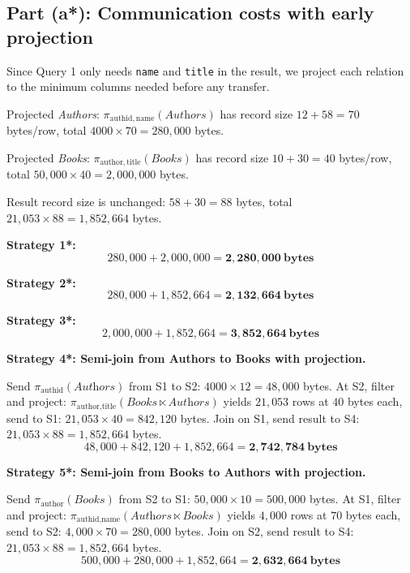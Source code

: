 \documentclass[a4paper,11pt]{article}
\newcommand{\lsj}{\mathbin{\ltimes}}   %
\newcommand{\Authors}{\textit{Authors}}
\newcommand{\Books}{\textit{Books}}
\begin{document}
\subsection*{Part (a*): Communication costs with early projection}

Since Query 1 only needs \texttt{name} and \texttt{title} in the result, we project each relation to the minimum columns needed before any transfer.

Projected \Authors: $\pi_{\text{authid},\,\text{name}}(\Authors)$ has record size $12 + 58 = 70$ bytes/row, total $4000 \times 70 = 280{,}000$ bytes.

Projected \Books: $\pi_{\text{author},\,\text{title}}(\Books)$ has record size $10 + 30 = 40$ bytes/row, total $50{,}000 \times 40 = 2{,}000{,}000$ bytes.

Result record size is unchanged: $58 + 30 = 88$ bytes, total $21{,}053 \times 88 = 1{,}852{,}664$ bytes.

\medskip

\textbf{Strategy 1*:}
\[
  280{,}000 + 2{,}000{,}000 = \mathbf{2{,}280{,}000\ \text{bytes}}
\]

\textbf{Strategy 2*:}
\[
  280{,}000 + 1{,}852{,}664 = \mathbf{2{,}132{,}664\ \text{bytes}}
\]

\textbf{Strategy 3*:}
\[
  2{,}000{,}000 + 1{,}852{,}664 = \mathbf{3{,}852{,}664\ \text{bytes}}
\]

\textbf{Strategy 4*: Semi-join from Authors to Books with projection.}

Send $\pi_{\text{authid}}(\Authors)$ from S1 to S2: $4000 \times 12 = 48{,}000$ bytes. At S2, filter and project: $\pi_{\text{author},\text{title}}(\Books \lsj \Authors)$ yields $21{,}053$ rows at $40$ bytes each, send to S1: $21{,}053 \times 40 = 842{,}120$ bytes. Join on S1, send result to S4: $21{,}053 \times 88 = 1{,}852{,}664$ bytes.
\[
  48{,}000 + 842{,}120 + 1{,}852{,}664 = \mathbf{2{,}742{,}784\ \text{bytes}}
\]

\textbf{Strategy 5*: Semi-join from Books to Authors with projection.}

Send $\pi_{\text{author}}(\Books)$ from S2 to S1: $50{,}000 \times 10 = 500{,}000$ bytes. At S1, filter and project: $\pi_{\text{authid},\text{name}}(\Authors \lsj \Books)$ yields $4{,}000$ rows at $70$ bytes each, send to S2: $4{,}000 \times 70 = 280{,}000$ bytes. Join on S2, send result to S4: $21{,}053 \times 88 = 1{,}852{,}664$ bytes.
\[
  500{,}000 + 280{,}000 + 1{,}852{,}664 = \mathbf{2{,}632{,}664\ \text{bytes}}
\]
\end{document}
